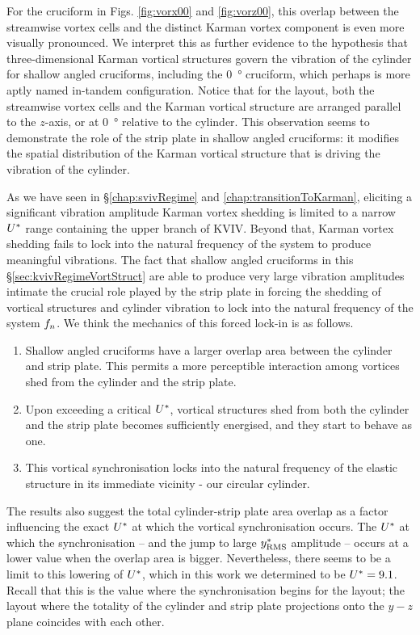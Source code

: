 \documentclass[oneside]{utmthesis}
\begin{document}
For the \angon{} cruciform in Figs. \ref{fig:vorx00} and \ref{fig:vorz00}, this overlap between the streamwise vortex cells and the distinct Karman vortex component is even more visually pronounced. We interpret this as further evidence to the hypothesis that three-dimensional Karman vortical structures govern the vibration of the cylinder for shallow angled cruciforms, including the \SI{0}{\degree} cruciform, which perhaps is more aptly named in-tandem configuration. Notice that for the \angon{} layout, both the streamwise vortex cells and the Karman vortical structure are arranged parallel to the $z$-axis, or at \SI{0}{\degree} relative to the cylinder. This observation seems to demonstrate the role of the strip plate in shallow angled cruciforms: it modifies the spatial distribution of the Karman vortical structure that is driving the vibration of the cylinder.

As we have seen in \S\ref{chap:svivRegime} and \ref{chap:transitionToKarman}, eliciting a significant vibration amplitude Karman vortex shedding is limited to a narrow $U^{*}$ range containing the upper branch of KVIV. Beyond that, Karman vortex shedding fails to lock into the natural frequency of the system to produce meaningful vibrations. The fact that shallow angled cruciforms in this \S\ref{sec:kvivRegimeVortStruct} are able to produce very large vibration amplitudes intimate the crucial role played by the strip plate in forcing the shedding of vortical structures and cylinder vibration to lock into the natural frequency of the system $f_{n}$. We think the mechanics of this forced lock-in is as follows.

\begin{enumerate}
  \item Shallow angled cruciforms have a larger overlap area between the cylinder and strip plate. This permits a more perceptible interaction among vortices shed from the cylinder and the strip plate.
  \item Upon exceeding a critical $U^{*}$, vortical structures shed from both the cylinder and the strip plate becomes sufficiently energised, and they start to behave as one.
  \item This vortical synchronisation locks into the natural frequency of the elastic structure in its immediate vicinity - our circular cylinder.
\end{enumerate}

\noindent The results also suggest the total cylinder-strip plate area overlap as a factor influencing the exact $U^{*}$ at which the vortical synchronisation occurs. The $U^{*}$ at which the synchronisation -- and the jump to large $y^{*}_{\text{RMS}}$ amplitude -- occurs at a lower value when the overlap area is bigger. Nevertheless, there seems to be a limit to this lowering of $U^{*}$, which in this work we determined to be $U^{*} = 9.1$. Recall that this is the value where the synchronisation begins for the \angon{} layout; the layout where the totality of the cylinder and strip plate projections onto the $y-z$ plane coincides with each other.
\end{document}
